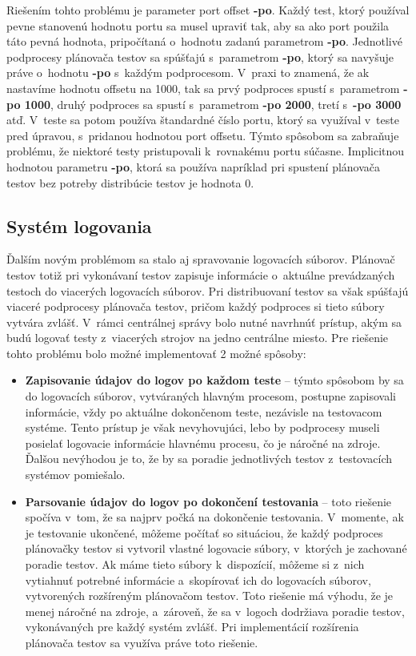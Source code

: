 Riešením tohto problému je parameter port offset \textbf{-po}. 
Každý test, ktorý používal pevne stanovenú hodnotu portu sa musel 
upraviť tak, aby sa ako port použila táto pevná hodnota, pripočítaná 
o~hodnotu zadanú parametrom \textbf{-po}.
Jednotlivé podprocesy plánovača testov sa spúšťajú s~parametrom 
\textbf{-po}, ktorý sa navyšuje práve o~hodnotu \textbf{-po} 
s~každým podprocesom. V~praxi to znamená, že ak nastavíme hodnotu 
offsetu na 1000, tak sa prvý podproces spustí s~parametrom
\textbf{-po 1000}, druhý podproces sa spustí s~parametrom \textbf{-po 2000}, 
tretí s~\textbf{-po 3000} atď. V~teste sa potom používa štandardné 
číslo portu, ktorý sa využíval v~teste pred úpravou, s~pridanou hodnotou 
port offsetu. Týmto spôsobom sa zabraňuje problému, že niektoré testy 
pristupovali k~rovnakému portu súčasne. Implicitnou hodnotou parametru 
\textbf{-po}, ktorá sa používa napríklad pri spustení plánovača testov
bez potreby distribúcie testov je hodnota 0. 

\subsection*{Systém logovania}
Ďalším novým problémom sa stalo aj spravovanie logovacích súborov. 
Plánovač testov totiž pri vykonávaní testov zapisuje informácie 
o~aktuálne prevádzaných testoch do viacerých logovacích súborov.
Pri distribuovaní testov sa však spúšťajú viaceré podprocesy plánovača 
testov, pričom každý podproces si tieto súbory vytvára zvlášť. 
V~rámci centrálnej správy bolo nutné navrhnúť prístup, akým sa budú
logovať testy z~viacerých strojov na jedno centrálne miesto.
Pre riešenie tohto problému bolo možné implementovať 2 možné spôsoby:
\begin{itemize}
\item \textbf{Zapisovanie údajov do logov po každom teste} -- 
týmto spôsobom by sa do logovacích súborov, vytváraných hlavným procesom,
postupne zapisovali informácie, vždy po aktuálne dokončenom teste, 
nezávisle na testovacom systéme. Tento prístup je však nevyhovujúci, 
lebo by podprocesy museli posielať logovacie informácie hlavnému procesu, 
čo je náročné na zdroje. Ďalšou nevýhodou je to, že by sa poradie 
jednotlivých testov z~testovacích systémov pomiešalo.
\item \textbf{Parsovanie údajov do logov po dokončení testovania} -- 
toto riešenie spočíva v~tom, že sa najprv počká na dokončenie testovania. 
V~momente, ak je testovanie ukončené, môžeme počítať so situáciou,
že každý podproces plánovačky testov si vytvoril vlastné logovacie súbory, 
v~ktorých je zachované poradie testov. Ak máme tieto súbory k~dispozícií, 
môžeme si z~nich vytiahnuť potrebné informácie a~skopírovať ich do 
logovacích súborov, vytvorených rozšíreným plánovačom testov. 
Toto riešenie má výhodu, že je menej náročné na zdroje, a~zároveň,
že sa v~logoch dodržiava poradie testov, vykonávaných pre každý systém zvlášť. 
Pri implementácií rozšírenia plánovača testov sa využíva práve toto riešenie.
\end{itemize} 

